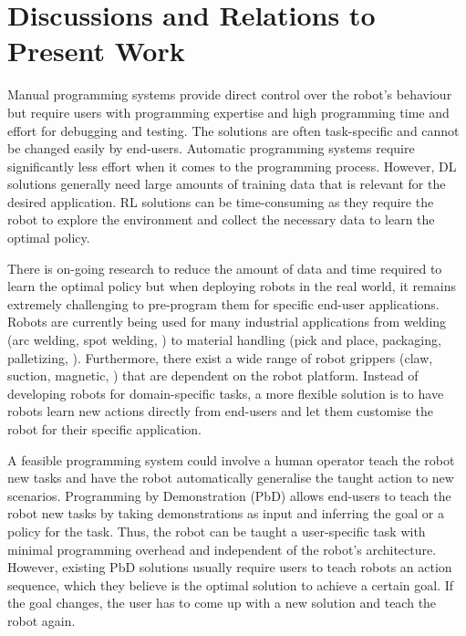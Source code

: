 \section{Discussions and Relations to Present Work}
Manual programming systems provide direct control over the robot's behaviour but require users with programming expertise and high programming time and effort for debugging and testing.
The solutions are often task-specific and cannot be changed easily by end-users.
Automatic programming systems require significantly less effort when it comes to the programming process. 
However, DL solutions generally need large amounts of training data that is relevant for the desired application.
RL solutions can be time-consuming as they require the robot to explore the environment and collect the necessary data to learn the optimal policy.

There is on-going research to reduce the amount of data and time required to learn the optimal policy but when deploying robots in the real world, it remains extremely challenging to pre-program them for specific end-user applications.
Robots are currently being used for many industrial applications from welding (arc welding, spot welding, \etc) to material handling (pick and place, packaging, palletizing, \etc).
Furthermore, there exist a wide range of robot grippers (claw, suction, magnetic, \etc) that are dependent on the robot platform.
Instead of developing robots for domain-specific tasks, a more flexible solution is to have robots learn new actions directly from end-users and let them customise the robot for their specific application.

A feasible programming system could involve a human operator teach the robot new tasks and have the robot automatically generalise the taught action to new scenarios.
Programming by Demonstration (PbD) allows end-users to teach the robot new tasks by taking demonstrations as input and inferring the goal or a policy for the task.
Thus, the robot can be taught a user-specific task with minimal programming overhead and independent of the robot's architecture.
However, existing PbD solutions usually require users to teach robots an action sequence, which they believe is the optimal solution to achieve a certain goal.
If the goal changes, the user has to come up with a new solution and teach the robot again.

